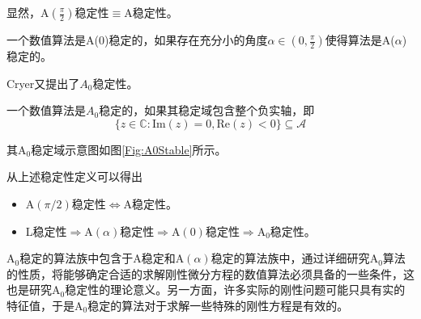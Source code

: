 显然，A$(\frac{\pi}{2})$稳定性$\equiv$A稳定性。
\begin{definition}[A($0$)稳定性]
一个数值算法是A($0$)稳定的\cite{袁新鼎1987,Fatunla1988}，如果存在充分小的角度$\alpha\in(0,\frac{\pi}{2})$使得算法是A($\alpha$)稳定的。
\end{definition}

Cryer又提出了$A_0$稳定性\cite{Cryer1973}。
\begin{definition}[$A_0$稳定性]
一个数值算法是$A_0$稳定的\cite{袁新鼎1987,Cryer1973,Fatunla1988}，如果其稳定域包含整个负实轴，即
\begin{equation}
\{z\in\mathbb{C}:\text{Im}(z)=0,\text{Re}(z)<0\}\subseteq\mathcal{A}
\end{equation}
\end{definition}
其$\text{A}_0$稳定域示意图如图\ref{Fig:A0Stable}所示。
\begin{figure}[htpb]
\centering
{}
\end{figure}

从上述稳定性定义可以得出
\begin{itemize}
\item[\ddag] A$(\pi/2)$稳定性$\iff$A稳定性。
\item[\ddag] L稳定性$\Longrightarrow$A$(\alpha)$稳定性$\Longrightarrow$A$(0)$稳定性$\Longrightarrow$$\text{A}_0$稳定性。
\end{itemize}

$\text{A}_0$稳定的算法族中包含于A稳定和A$(\alpha)$稳定的算法族中，通过详细研究$\text{A}_0$算法的性质，将能够确定合适的求解刚性微分方程的数值算法必须具备的一些条件，这也是研究$\text{A}_0$稳定性的理论意义。另一方面，许多实际的刚性问题可能只具有实的特征值，于是$\text{A}_0$稳定的算法对于求解一些特殊的刚性方程是有效的。

